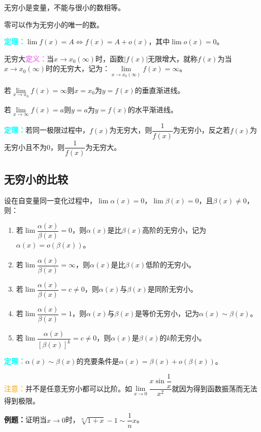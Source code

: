 \documentclass[UTF8, 12pt]{ctexart}
\begin{document}
无穷小是变量，不能与很小的数相等。

零可以作为无穷小的唯一的数。

\textcolor{aqua}{\textbf{定理：}}$\lim f(x)=A\Leftrightarrow f(x)=A+o(x)$，其中$\lim o(x)=0$。

无穷大\textcolor{violet}{\textbf{定义：}}当$x\to x_0(\infty)$时，函数$\vert f(x)\vert$无限增大，就称$f(x)$为当$x\to x_0(\infty)$时的无穷大，记为：$\lim\limits_{x\to x_0(\infty)}f(x)=\infty$。

若$\lim\limits_{x\to x_0}f(x)=\infty$则$x=x_0$为$y=f(x)$的垂直渐进线。

若$\lim\limits_{x\to\infty}f(x)=a$则$y=a$为$y=f(x)$的水平渐进线。

\textcolor{aqua}{\textbf{定理：}}若同一极限过程中，$f(x)$为无穷大，则$\dfrac{1}{f(x)}$为无穷小，反之若$f(x)$为无穷小且不为0，则$\dfrac{1}{f(x)}$为无穷大。

\subsection{无穷小的比较}

设在自变量同一变化过程中，$\lim\alpha(x)=0$，$\lim\beta(x)=0$，且$\beta(x)\neq 0$，则：

\begin{enumerate}
    \item 若$\lim\dfrac{\alpha(x)}{\beta(x)}=0$，则$\alpha(x)$是比$\beta(x)$高阶的无穷小，记为$\alpha(x)=o(\beta(x))$。
    \item 若$\lim\dfrac{\alpha(x)}{\beta(x)}=\infty$，则$\alpha(x)$是比$\beta(x)$低阶的无穷小。
    \item 若$\lim\dfrac{\alpha(x)}{\beta(x)}=c\neq 0$，则$\alpha(x)$与$\beta(x)$是同阶无穷小。
    \item 若$\lim\dfrac{\alpha(x)}{\beta(x)}=1$，则$\alpha(x)$与$\beta(x)$是等价无穷小，记为$\alpha(x)\sim\beta(x)$。
    \item 若$\lim\dfrac{\alpha(x)}{[\beta(x)]^k}=c\neq 0$，则$\alpha(x)$是$\beta(x)$的$k$阶无穷小。
\end{enumerate}

\textcolor{aqua}{\textbf{定理：}}$\alpha(x)\sim\beta(x)$的充要条件是$\alpha(x)=\beta(x)+o(\beta(x))$。

\textcolor{orange}{注意：}并不是任意无穷小都可以比阶。如$\lim\limits_{x\to 0}\dfrac{x\sin\dfrac{1}{x}}{x^2}$就因为得到函数振荡而无法得到极限。

\textbf{例题：}证明当$x\to 0$时，$\sqrt[n]{1+x}-1\sim\dfrac{1}{n}x$。
\end{document}
